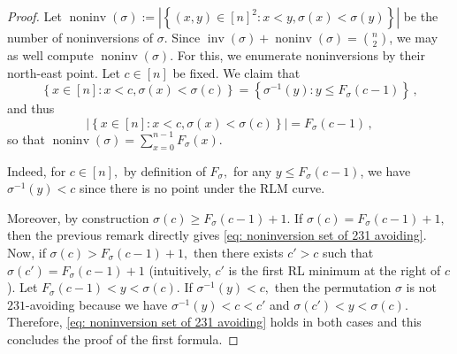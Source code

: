 \documentclass[a4paper,11pt]{amsart}
\newcommand{\card}[1]{\left|\left\{ #1 \right\}\right|}
\DeclareMathOperator{\inv}{inv}
\DeclareMathOperator{\noninv}{noninv}
\theoremstyle{definition}
\begin{document}
\begin{proof}
 Let $\noninv(\sigma) := \card{ (x,y)\in[n]^2 : x<y , \sigma(x)<\sigma(y) }$ be the number of noninversions of $\sigma$.
    Since $\inv(\sigma) + \noninv(\sigma) = \binom{n}{2}$, we may as well compute $\noninv(\sigma)$.
    For this, we enumerate noninversions by their north-east point.
    Let $c\in[n]$ be fixed.
    We claim that 
    \begin{equation}\label{eq: noninversion set of 231 avoiding}
        \left\{ x\in[n] : x<c , \sigma(x)<\sigma(c) \right\}
        = \left\{ \sigma^{-1}(y) : y \le F_\sigma(c-1) \right\} \,,
    \end{equation}
    and thus
    \begin{equation*}\label{eq: noninversion count of 231 avoiding}
        \card{ x\in[n] : x<c , \sigma(x)<\sigma(c) }
        = F_\sigma(c-1) \,,
    \end{equation*}
    so that $\noninv(\sigma) =  \sum_{x=0}^{n-1} F_\sigma(x).$

Indeed, for $c\in [n],$ by definition of $F_\sigma,$ for any $y \le    F_\sigma(c-1)$, we have $\sigma^{-1}(y)<c $ since there is no point under the RLM curve.

Moreover, by construction $\sigma(c) \ge  F_\sigma(c-1) +1.$ If $ \sigma(c) =  F_\sigma(c-1) +1,$ then the previous remark directly gives \eqref{eq: noninversion set of 231 avoiding}. Now, if  $ \sigma(c) > F_\sigma(c-1) +1,$ then there exists $c'>c$ such that  $ \sigma(c') = F_\sigma(c-1) +1$ (intuitively, $c'$ is the first RL minimum at the right of $c$). Let $ F_\sigma(c-1)< y< \sigma(c).$
If $\sigma^{-1}(y) < c,$ then the permutation $\sigma$ is not $231$-avoiding because we have $\sigma^{-1}(y) < c < c'$ and
$\sigma(c')< y < \sigma(c).$ Therefore, \eqref{eq: noninversion set of 231 avoiding} holds in both cases and this concludes the proof of the first formula.


\end{proof}
\end{document}
